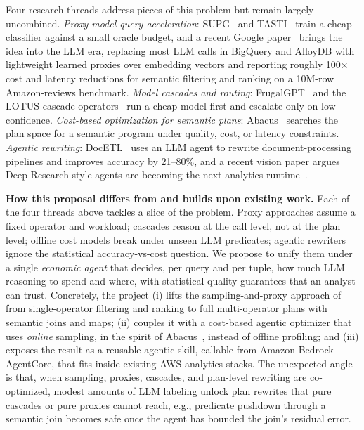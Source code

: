 \documentclass[11pt]{article}
\begin{document}
Four research threads address pieces of this problem but remain largely uncombined. \emph{Proxy-model query acceleration}: SUPG~\cite{kang2020supg} and TASTI~\cite{kang2022tasti} train a cheap classifier against a small oracle budget, and a recent Google paper~\cite{chung2026proxy} brings the idea into the LLM era, replacing most LLM calls in BigQuery and AlloyDB with lightweight learned proxies over embedding vectors and reporting roughly 100$\times$ cost and latency reductions for semantic filtering and ranking on a 10M-row Amazon-reviews benchmark. \emph{Model cascades and routing}: FrugalGPT~\cite{chen2023frugalgpt} and the LOTUS cascade operators~\cite{patel2025lotus} run a cheap model first and escalate only on low confidence. \emph{Cost-based optimization for semantic plans}: Abacus~\cite{russo2025abacus} searches the plan space for a semantic program under quality, cost, or latency constraints. \emph{Agentic rewriting}: DocETL~\cite{shankar2025docetl} uses an LLM agent to rewrite document-processing pipelines and improves accuracy by 21--80\%, and a recent vision paper argues Deep-Research-style agents are becoming the next analytics runtime~\cite{russo2025deepresearch}.

\noindent\textbf{How this proposal differs from and builds upon existing work.}
Each of the four threads above tackles a slice of the problem. Proxy approaches assume a fixed operator and workload; cascades reason at the call level, not at the plan level; offline cost models break under unseen LLM predicates; agentic rewriters ignore the statistical accuracy-vs-cost question. We propose to unify them under a single \emph{economic agent} that decides, per query and per tuple, how much LLM reasoning to spend and where, with statistical quality guarantees that an analyst can trust. Concretely, the project (i) lifts the sampling-and-proxy approach of~\cite{chung2026proxy} from single-operator filtering and ranking to full multi-operator plans with semantic joins and maps; (ii) couples it with a cost-based agentic optimizer that uses \emph{online} sampling, in the spirit of Abacus~\cite{russo2025abacus}, instead of offline profiling; and (iii) exposes the result as a reusable agentic skill, callable from Amazon Bedrock AgentCore, that fits inside existing AWS analytics stacks. The unexpected angle is that, when sampling, proxies, cascades, and plan-level rewriting are co-optimized, modest amounts of LLM labeling unlock plan rewrites that pure cascades or pure proxies cannot reach, e.g., predicate pushdown through a semantic join becomes safe once the agent has bounded the join's residual error.
\end{document}
